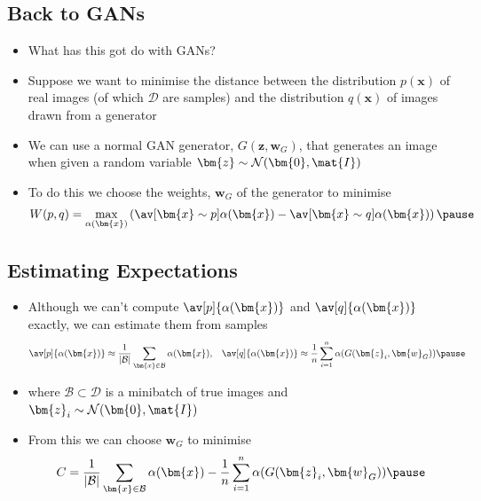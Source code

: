 \begin{slide}
\section{Back to GANs}

\begin{PauseHighLight}
  \begin{itemize}
  \item What has this got do with GANs?\pause
  \item Suppose we want to minimise the distance between the
    distribution $p(\bm{x})$ of real images (of which $\mathcal{D}$
    are samples) and the distribution $q(\bm{x})$ of images drawn from
    a generator\pause
  \item We can use a normal GAN generator, $G(\bm{z}, \bm{w}_G)$, that
    generates an image when given a random variable
    $\bm{z}\sim\mathcal{N}(\bm{0},\mat{I})$\pause 
  \item To do this we choose the weights, $\bm{w}_G$ of the generator
    to minimise
    \begin{align*}
      W(p,q) = \max_{\alpha(\bm{x})} \left( \av[\bm{x}\sim p]{\alpha(\bm{x})} -
      \av[\bm{x}\sim q]{\alpha(\bm{x})} \right)\pause 
    \end{align*}
  \end{itemize}
\end{PauseHighLight}

\end{slide}


\begin{slide}
\section{Estimating Expectations}

\begin{PauseHighLight}
  \begin{itemize}
  \item Although we can't compute $\av[p]{\alpha(\bm{x})}$ and
    $\av[q]{\alpha(\bm{x})}$ exactly, we can estimate them from
    samples
    \begin{align*}
     \av[p]{\alpha(\bm{x})}
      &\approx \frac{1}{|\mathcal{B}|}
        \sum_{\bm{x}\in\mathcal{B}} \alpha(\bm{x}),
      &
        \av[q]{\alpha(\bm{x})}
      &\approx \frac{1}{n} \sum_{i=1}^n
        \alpha(G(\bm{z}_i,\bm{w}_G))\pause
    \end{align*}
  \item where $\mathcal{B}\subset\mathcal{D}$ is a minibatch of true
    images and $\bm{z}_i\sim\mathcal{N}(\bm{0},\mat{I})$\pause
  \item From this we can choose $\bm{w}_G$ to minimise
    \begin{align*}
      C = \frac{1}{|\mathcal{B}|}
      \sum_{\bm{x}\in\mathcal{B}} \alpha(\bm{x}) -
      \frac{1}{n} \sum_{i=1}^n \alpha(G(\bm{z}_i,\bm{w}_G))\pause
    \end{align*}
  \end{itemize}
\end{PauseHighLight}
\end{slide}


